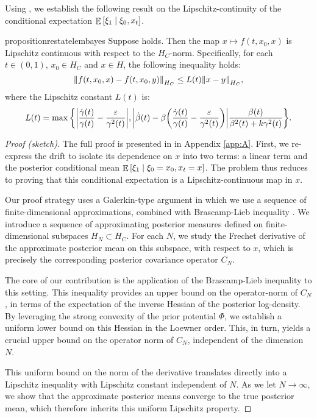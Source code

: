 Using , we establish the following result on the Lipschitz-continuity of the conditional expectation \(\mathop{\mathbb{E}}\qty[ \xi_{1} \mid \xi_{0}, x_{t}]\).

\begin{restatable}{proposition}{restatelembayes}\label{lem:bayes}
  Suppose  holds. Then the map \(x \mapsto f(t, x_{0}, x)\) is Lipschitz continuous with respect to the \(H_{C}\)-norm. Specifically, for each \(t \in (0, 1)\), \(x_{0} \in H_{C}\) and \(x \in H\), the following inequality holds:
  \[
    \norm{f(t, x_{0}, x) - f(t, x_{0}, y)}_{H_{C}} \leq L(t) \norm{x - y}_{H_{C}},
  \]
  where the Lipschitz constant \(L(t)\) is:
  \[
    L(t) =  \mathop{\underset{}{\max}}\qty{\abs{\frac{\dot{\gamma}(t)}{\gamma(t)} - \frac{\varepsilon}{\gamma^{2}(t)}}, \abs{\dot{\beta}(t) - \beta\qty(\frac{\dot{\gamma}(t)}{\gamma(t)} - \frac{\varepsilon}{\gamma^{2}(t)})} \frac{\beta(t)}{\beta^{2}(t) + k \gamma^{2}(t)}}.
  \]
\end{restatable}
\begin{proof}[Proof (sketch)]
  The full proof is presented in  in Appendix \ref{app:A}.
  First, we re-express the drift to isolate its dependence on \(x\) into two terms: a linear term and the posterior conditional mean \(\mathop{\mathbb{E}}\qty[\xi_{1} \mid \xi_{0} = x_{0}, x_{t}= x]\). The problem thus reduces to proving that this conditional expectation is a Lipschitz-continuous map in \(x\).

  Our proof strategy uses a Galerkin-type argument in which we use a sequence of finite-dimensional approximations, combined with Brascamp-Lieb inequality \citep{brascamp1976extensions}. We introduce a sequence of approximating posterior measures defined on finite-dimensional subspaces \(H_{N} \subset H_{C}\). For each \(N\), we study the Frechet derivative of the approximate posterior mean on this subspace, with respect to \(x\), which is precisely the corresponding posterior covariance operator \(C_{N}\).

  The core of our contribution is the application of the Brascamp-Lieb inequality to this setting. This inequality provides an upper bound on the operator-norm of \(C_{N}\), in terms of the expectation of the inverse Hessian of the posterior log-density. By leveraging the strong convexity of the prior potential \(\Phi\), we establish a uniform lower bound on this Hessian in the Loewner order. This, in turn, yields a crucial upper bound on the operator norm of \(C_{N}\), independent of the dimension \(N\).

  This uniform bound on the norm of the derivative translates directly into a Lipschitz inequality with Lipschitz constant independent of \(N\). As we let \(N \to \infty\), we show that the approximate posterior means converge to the true posterior mean, which therefore inherits this uniform Lipschitz property.
\end{proof}

